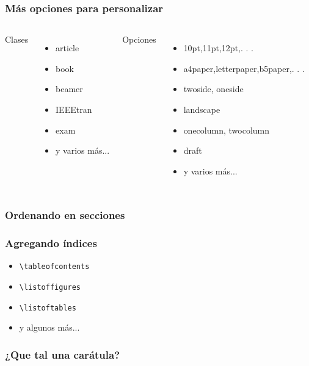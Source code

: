 \documentclass[svgnames]{beamer}
\begin{document}
\begin{frame}
  \frametitle{Más opciones para personalizar}
  \begin{columns}
    \centering
      Clases\\[.2cm]
      \begin{itemize}
        \item article
        \item book
        \item beamer
        \item IEEEtran
        \item exam
        \item y varios más...
      \end{itemize}
    \centering
      Opciones\\[.2cm]
      \begin{itemize}
        \item 10pt,11pt,12pt,. . .
        \item a4paper,letterpaper,b5paper,. . .
        \item twoside, oneside
        \item landscape
        \item onecolumn, twocolumn
        \item draft
        \item y varios más...
      \end{itemize}
  \end{columns}
\end{frame}

\begin{frame}
  \frametitle{Ordenando en secciones}
  
\end{frame}

\begin{frame}
  \frametitle{Agregando índices}
  \begin{itemize}
    \item \texttt{\textbackslash{}tableofcontents}
    \item \texttt{\textbackslash{}listoffigures}
    \item \texttt{\textbackslash{}listoftables}
    \item y algunos más...
  \end{itemize}
\end{frame}

\begin{frame}
  \frametitle{¿Que tal una carátula?}
  
\end{frame}
\end{document}
